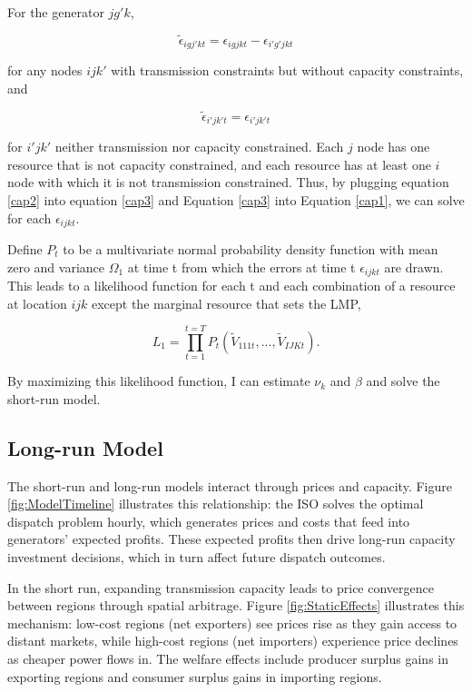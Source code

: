 \documentclass[12pt]{article}
\begin{document}
\noindent For the generator $jg'k$, 

\begin{equation}\label{cap3}
\tilde{\epsilon}_{igj'kt}=\epsilon_{igjkt}-\epsilon_{i'g'jkt}
\end{equation}

\noindent for any nodes $ijk'$ with transmission constraints but without capacity constraints, and 

\begin{equation}\label{cap2}
\tilde{\epsilon}_{i'jk't}=\epsilon_{i'jk't}
\end{equation}

\noindent for $i'jk'$ neither transmission nor capacity constrained. Each $j$ node has one resource that is not capacity constrained, and each resource has at least one $i$ node with which it is not transmission constrained. Thus, by plugging equation \ref{cap2} into equation \ref{cap3} and Equation \ref{cap3} into Equation \ref{cap1}, we can solve for each $\epsilon_{ijkt}.$

Define $P_t$ to be a multivariate normal probability density function with mean zero and variance $\Omega_1$ at time t from which the errors at time t $\epsilon_{ijkt}$ are drawn. This leads to a likelihood function for each t and each combination of a resource at location $ijk$ except the marginal resource that sets the LMP,

\begin{equation}\label{likelihoodFunction}
L_1= \prod_{t=1}^{t=T} P_t(\tilde{V}_{111t},...,\tilde{V}_{IJKt}).
\end{equation}

\noindent By maximizing this likelihood function, I can estimate $\nu_k$ and $\beta$ and solve the short-run model.

\subsection{Long-run Model}

The short-run and long-run models interact through prices and capacity. Figure \ref{fig:ModelTimeline} illustrates this relationship: the ISO solves the optimal dispatch problem hourly, which generates prices and costs that feed into generators' expected profits. These expected profits then drive long-run capacity investment decisions, which in turn affect future dispatch outcomes.

In the short run, expanding transmission capacity leads to price convergence between regions through spatial arbitrage. Figure \ref{fig:StaticEffects} illustrates this mechanism: low-cost regions (net exporters) see prices rise as they gain access to distant markets, while high-cost regions (net importers) experience price declines as cheaper power flows in. The welfare effects include producer surplus gains in exporting regions and consumer surplus gains in importing regions.
\end{document}
